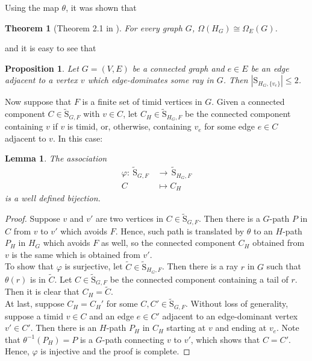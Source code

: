 \documentclass[10pt]{article}
\numberwithin{equation}{subsection}
\newtheorem{theorem}[equation]{Theorem}
\newtheorem{lemma}[equation]{Lemma}
\newtheorem{proposition}[equation]{Proposition}
\theoremstyle{remark}
\begin{document}
 Using the map $\theta$, it was shown that
\begin{theorem}[Theorem 2.1 in \cite{aurichi2024topologicalremarksendedgeend}]\label{THM_HGHomeo}
For every graph $G$, $\Omega(H_G)\cong \Omega_E(G)$.
\end{theorem}

\noindent and it is easy to see that

\begin{proposition}\label{PROP_Dominant_FinComp}
    Let $G = (V,E)$ be a connected graph and $e\in E$ be an edge adjacent to a vertex $v$ which edge-dominates some ray in $G$. Then $|\mathrm{S}_{H_G, \{v_e\}}|\le 2$.
\end{proposition}

Now suppose that $F$ is a finite set of timid vertices in $G$. Given a connected component $C\in \tilde{\mathrm{S}}_{G,F}$ with $v\in C$, let $C_H\in \tilde{\mathrm{S}}_{H_G,F}$ be the connected component containing $v$ if $v$ is timid, or, otherwise, containing $v_e$ for some edge $e\in C$ adjacent to $v$. In this case:

\begin{lemma}\label{LEMMA_Compon_Bijec}
    The association 
    \begin{align*}
        \varphi\colon \: \tilde{\mathrm{S}}_{G,F}\,&\to \,\tilde{\mathrm{S}}_{H_G,F}\\
        C&\mapsto C_H
    \end{align*}
    is a well defined bijection.
\end{lemma}
\begin{proof}
    Suppose $v$ and $v'$ are two vertices in $C\in \tilde{\mathrm{S}}_{G,F}$. Then there is a $G$-path $P$ in $C$ from $v$ to $v'$ which avoids $F$. Hence, such path is translated by $\theta$ to an $H$-path $P_H$ in $H_G$ which avoids $F$ as well, so the connected component $C_H$ obtained from $v$ is the same which is obtained from $v'$.\\

    To show that $\varphi$ is surjective, let $\tilde{C}\in \tilde{\mathrm{S}}_{H_G,F}$. Then there is a ray $r$ in $G$ such that $\theta (r)$ is in $\tilde{C}$. Let $C\in \tilde{\mathrm{S}}_{G,F}$ be the connected component containing a tail of $r$. Then it is clear that $C_H = \tilde{C}$.\\

    At last, suppose $C_H = C_H'$ for some $C, C'\in \tilde{\mathrm{S}}_{G,F}$. Without loss of generality, suppose a timid $v\in C$ and an edge $e\in C'$ adjacent to an edge-dominant vertex $v'\in C'$. Then there is an $H$-path $P_H$ in $C_H$ starting at $v$ and ending at $v_e$. Note that $\theta^{-1}(P_H)=P$ is a $G$-path connecting $v$ to $v'$, which shows that $C = C'$. Hence, $\varphi$ is injective and the proof is complete.
\end{proof}
\end{document}
